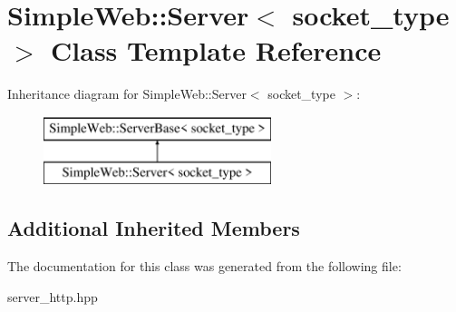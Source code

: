 \hypertarget{a00267}{}\section{Simple\+Web\+:\+:Server$<$ socket\+\_\+type $>$ Class Template Reference}
\label{a00267}
Inheritance diagram for Simple\+Web\+:\+:Server$<$ socket\+\_\+type $>$\+:\begin{figure}[H]
\begin{center}
\leavevmode
\includegraphics[height=2.000000cm]{a00267}
\end{center}
\end{figure}
\subsection*{Additional Inherited Members}


The documentation for this class was generated from the following file\+:\begin{DoxyCompactItemize}
\item 
server\+\_\+http.\+hpp\end{DoxyCompactItemize}
